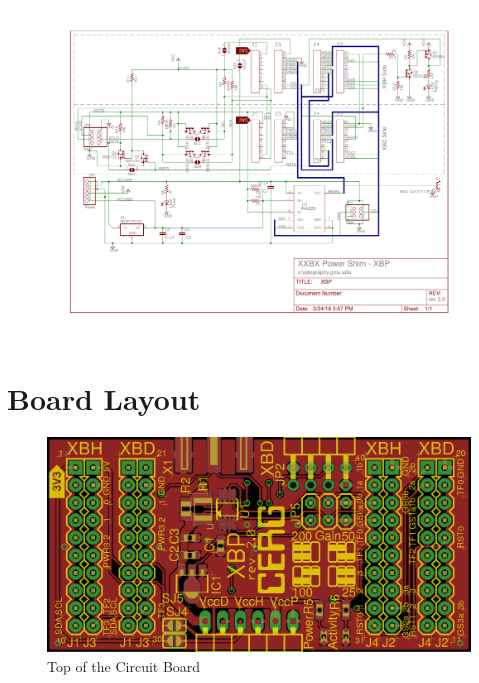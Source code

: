 \documentclass[twoside,11pt]{cergdoc}
\begin{document}
\begin{appendix}
\begin{figure}[ht]
    \vspace{-1.6cm}
    \hspace{-1.2cm}\includegraphics[scale=0.88, angle=90]{figures/XBP-schematic}
\end{figure}

\chapter{Board Layout}\label{sec:board}
\begin{figure}[ht]
  \begin{center}
    \includegraphics[scale=0.25]{figures/XBP-top}
    \caption{Top of the Circuit Board}
  \end{center}
\end{figure}


\end{appendix}
\end{document}
